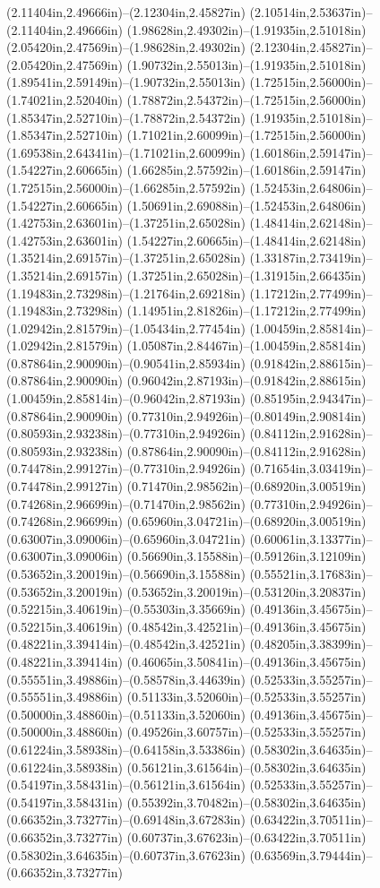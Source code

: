 (2.11404in,2.49666in)--(2.12304in,2.45827in) (2.10514in,2.53637in)--(2.11404in,2.49666in) (1.98628in,2.49302in)--(1.91935in,2.51018in) (2.05420in,2.47569in)--(1.98628in,2.49302in) (2.12304in,2.45827in)--(2.05420in,2.47569in) (1.90732in,2.55013in)--(1.91935in,2.51018in) (1.89541in,2.59149in)--(1.90732in,2.55013in) (1.72515in,2.56000in)--(1.74021in,2.52040in) (1.78872in,2.54372in)--(1.72515in,2.56000in) (1.85347in,2.52710in)--(1.78872in,2.54372in) (1.91935in,2.51018in)--(1.85347in,2.52710in) (1.71021in,2.60099in)--(1.72515in,2.56000in) (1.69538in,2.64341in)--(1.71021in,2.60099in) (1.60186in,2.59147in)--(1.54227in,2.60665in) (1.66285in,2.57592in)--(1.60186in,2.59147in) (1.72515in,2.56000in)--(1.66285in,2.57592in) (1.52453in,2.64806in)--(1.54227in,2.60665in) (1.50691in,2.69088in)--(1.52453in,2.64806in) (1.42753in,2.63601in)--(1.37251in,2.65028in) (1.48414in,2.62148in)--(1.42753in,2.63601in) (1.54227in,2.60665in)--(1.48414in,2.62148in) (1.35214in,2.69157in)--(1.37251in,2.65028in) (1.33187in,2.73419in)--(1.35214in,2.69157in) (1.37251in,2.65028in)--(1.31915in,2.66435in) (1.19483in,2.73298in)--(1.21764in,2.69218in) (1.17212in,2.77499in)--(1.19483in,2.73298in) (1.14951in,2.81826in)--(1.17212in,2.77499in) (1.02942in,2.81579in)--(1.05434in,2.77454in) (1.00459in,2.85814in)--(1.02942in,2.81579in) (1.05087in,2.84467in)--(1.00459in,2.85814in) (0.87864in,2.90090in)--(0.90541in,2.85934in) (0.91842in,2.88615in)--(0.87864in,2.90090in) (0.96042in,2.87193in)--(0.91842in,2.88615in) (1.00459in,2.85814in)--(0.96042in,2.87193in) (0.85195in,2.94347in)--(0.87864in,2.90090in) (0.77310in,2.94926in)--(0.80149in,2.90814in) (0.80593in,2.93238in)--(0.77310in,2.94926in) (0.84112in,2.91628in)--(0.80593in,2.93238in) (0.87864in,2.90090in)--(0.84112in,2.91628in) (0.74478in,2.99127in)--(0.77310in,2.94926in) (0.71654in,3.03419in)--(0.74478in,2.99127in) (0.71470in,2.98562in)--(0.68920in,3.00519in) (0.74268in,2.96699in)--(0.71470in,2.98562in) (0.77310in,2.94926in)--(0.74268in,2.96699in) (0.65960in,3.04721in)--(0.68920in,3.00519in) (0.63007in,3.09006in)--(0.65960in,3.04721in) (0.60061in,3.13377in)--(0.63007in,3.09006in) (0.56690in,3.15588in)--(0.59126in,3.12109in) (0.53652in,3.20019in)--(0.56690in,3.15588in) (0.55521in,3.17683in)--(0.53652in,3.20019in) (0.53652in,3.20019in)--(0.53120in,3.20837in) (0.52215in,3.40619in)--(0.55303in,3.35669in) (0.49136in,3.45675in)--(0.52215in,3.40619in) (0.48542in,3.42521in)--(0.49136in,3.45675in) (0.48221in,3.39414in)--(0.48542in,3.42521in) (0.48205in,3.38399in)--(0.48221in,3.39414in) (0.46065in,3.50841in)--(0.49136in,3.45675in) (0.55551in,3.49886in)--(0.58578in,3.44639in) (0.52533in,3.55257in)--(0.55551in,3.49886in) (0.51133in,3.52060in)--(0.52533in,3.55257in) (0.50000in,3.48860in)--(0.51133in,3.52060in) (0.49136in,3.45675in)--(0.50000in,3.48860in) (0.49526in,3.60757in)--(0.52533in,3.55257in) (0.61224in,3.58938in)--(0.64158in,3.53386in) (0.58302in,3.64635in)--(0.61224in,3.58938in) (0.56121in,3.61564in)--(0.58302in,3.64635in) (0.54197in,3.58431in)--(0.56121in,3.61564in) (0.52533in,3.55257in)--(0.54197in,3.58431in) (0.55392in,3.70482in)--(0.58302in,3.64635in) (0.66352in,3.73277in)--(0.69148in,3.67283in) (0.63422in,3.70511in)--(0.66352in,3.73277in) (0.60737in,3.67623in)--(0.63422in,3.70511in) (0.58302in,3.64635in)--(0.60737in,3.67623in) (0.63569in,3.79444in)--(0.66352in,3.73277in) 